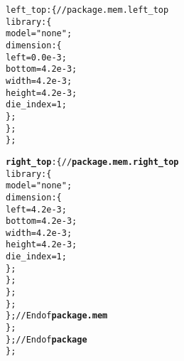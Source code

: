 {\begin{alltt}
                    left\_top: \{ // package.mem.left\_top
                        library: \{
                            model = "none";
                            dimension: \{
                                left = 0.0e-3;
                                bottom = 4.2e-3;
                                width = 4.2e-3;
                                height = 4.2e-3;
                                die_index = 1;
                            \};
                        \};
                    \};
                    
                   {\bf right\_top}: \{ //{\bf package.mem.right\_top}
                        library: \{
                            model = "none";
                            dimension: \{
                                left = 4.2e-3;
                                bottom = 4.2e-3;
                                width = 4.2e-3;
                                height = 4.2e-3;
                                die_index = 1;
                            \};
                        \};
                    \};
                \};
            \}; // End of{\bf package.mem}
        \};
    \}; // End of{\bf package}
\};
\end{alltt}}


